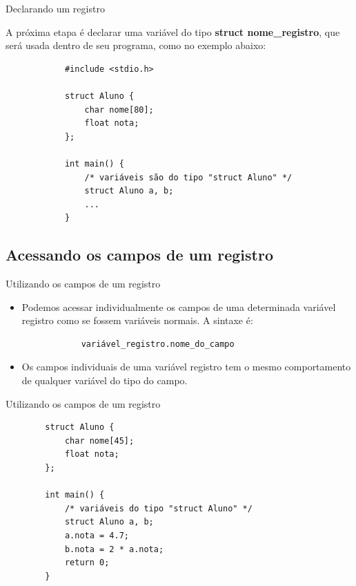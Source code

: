 \documentclass[handout]{beamer}
\begin{document}
\begin{frame}[fragile]{Declarando um registro}

    A próxima etapa é declarar uma variável do tipo
    \textbf{struct nome\_registro}, que
    será usada dentro de seu programa, como no exemplo abaixo:

        \begin{verbatim}
            #include <stdio.h>

            struct Aluno {
                char nome[80];
                float nota;
            };

            int main() {
                /* variáveis são do tipo "struct Aluno" */
                struct Aluno a, b;
                ...
            }
        \end{verbatim}

\end{frame}

\subsection{Acessando os campos de um registro}

\begin{frame}[fragile]{Utilizando os campos de um registro}

    \begin{itemize}
        \item Podemos acessar individualmente os campos de
        uma determinada variável registro como se fossem
        variáveis normais. A sintaxe é:

        \begin{verbatim}
            variável_registro.nome_do_campo
        \end{verbatim}

        \item Os campos individuais de uma variável registro tem o
        mesmo comportamento de qualquer variável do tipo do campo.
    \end{itemize}

\end{frame}

\begin{frame}[fragile]{Utilizando os campos de um registro}

    \begin{verbatim}
        struct Aluno {
            char nome[45];
            float nota;
        };

        int main() {
            /* variáveis do tipo "struct Aluno" */
            struct Aluno a, b;
            a.nota = 4.7;
            b.nota = 2 * a.nota;
            return 0;
        }
    \end{verbatim}

\end{frame}
\end{document}
